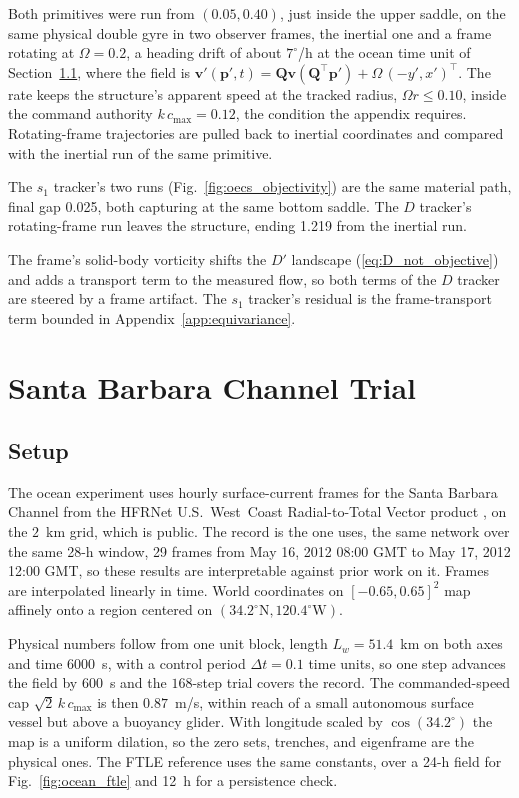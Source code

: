 \documentclass[lettersize,journal]{IEEEtran}
\begin{document}
Both primitives were run from $(0.05, 0.40)$, just inside the upper
saddle, on the same physical double gyre in two observer
frames, the inertial one and a frame rotating at $\Omega = 0.2$, a heading
drift of about $7^\circ$/h at the ocean time unit of
Section~\ref{sec:ocean_sim}, where the field is $\mathbf{v}'(\mathbf{p}', t) =
\mathbf{Q}\mathbf{v}(\mathbf{Q}^\top \mathbf{p}') + \Omega\,(-y',
x')^\top$. The rate keeps the structure's apparent speed
at the tracked radius, $\Omega r \leq 0.10$, inside the command
authority $k\,c_{\max} = 0.12$, the condition the appendix requires.
Rotating-frame trajectories are pulled back to inertial coordinates and
compared with the inertial run of the same primitive.

The $s_1$ tracker's two runs (Fig.~\ref{fig:oecs_objectivity}) are the
same material path, final gap 0.025, both capturing at the same bottom
saddle. The $D$ tracker's rotating-frame run leaves the structure, ending
1.219 from the inertial run.

The frame's solid-body vorticity shifts the $D'$ landscape
(\ref{eq:D_not_objective}) and adds a transport term to the measured flow,
so both terms of the $D$ tracker are steered by a frame artifact. The
$s_1$ tracker's residual is the frame-transport term bounded in
Appendix~\ref{app:equivariance}.

\section{Santa Barbara Channel Trial}
\label{sec:ocean}

\subsection{Setup}
\label{sec:ocean_sim}

The ocean experiment uses hourly surface-current frames for the Santa
Barbara Channel from the HFRNet U.S.~West~Coast Radial-to-Total Vector
product \cite{36}, on the $2$~km grid, which is public. The record is the one \cite{26} uses, the same network over the same 28-h window, 29 frames from May 16, 2012 08:00 GMT to May 17, 2012 12:00 GMT, so these results are interpretable against prior work on it.
Frames are interpolated linearly in time. World
coordinates on $[-0.65, 0.65]^2$ map affinely onto a region centered on
$(34.2^{\circ}\mathrm{N}, 120.4^{\circ}\mathrm{W})$.

Physical numbers follow from one unit block, length $L_w = 51.4$~km on
both axes and time $6000$~s, with a control period $\Delta t = 0.1$
time units, so one step advances the field by $600$~s and the
$168$-step trial covers the record. The commanded-speed cap
$\sqrt{2}\,k\,c_{\max}$ is then $0.87$~m/s, within reach of a small
autonomous surface vessel but above a buoyancy glider. With longitude
scaled by $\cos(34.2^{\circ})$ the map is a uniform dilation, so the zero
sets, trenches, and eigenframe are the physical ones. The FTLE reference
uses the same constants, over a 24-h field for Fig.~\ref{fig:ocean_ftle}
and 12~h for a persistence check.
\end{document}
